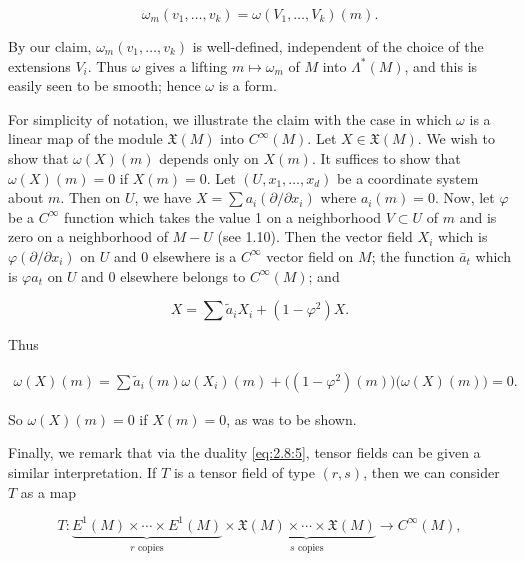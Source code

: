 \begin{equation}
\tag{4}\label{eq:2.18:4}
\omega_{m}(v_{1},\ldots,v_{k})=\omega(V_{1},\ldots,V_{k})(m).
\end{equation}

By our claim,  $ \omega_m(v_1, \ldots, v_k) $ is well-defined, independent of the choice of the extensions  $ V_i $. Thus  $ \omega $ gives a lifting  $ m \mapsto \omega_m $ of  $ M $ into  $ \Lambda^*(M) $, and this is easily seen to be smooth; hence  $ \omega $ is a form.

For simplicity of notation, we illustrate the claim with the case in which $\omega$ is a linear map of the module $\mathfrak{X}(M)$ into $C^\infty(M)$. Let $X\in\mathfrak{X}(M)$. We wish to show that $\omega(X)(m)$ depends only on $X(m)$. It suffices to show that $\omega(X)(m)=0$ if $X(m)=0$. Let $(U,x_1,\ldots,x_d)$ be a coordinate system about $m$. Then on $U$, we have $X=\sum a_i(\partial/\partial x_i)$ where $a_i(m)=0$. Now, let $\varphi$ be a $C^\infty$ function which takes the value 1 on a neighborhood $V\subset U$ of $m$ and is zero on a neighborhood of $M-U$ (see 1.10). Then the vector field $X_i$ which is $\varphi(\partial/\partial x_i)$ on $U$ and $0$ elsewhere is a $C^\infty$ vector field on $M$; the function $\bar{a}_t$ which is $\varphi a_t$ on $U$ and $0$ elsewhere belongs to $C^\infty(M)$; and

\begin{equation}
\tag{5}\label{eq:2.18:5}
X=\sum\tilde{a}_{i}X_{i}+(1-\varphi^{2})X.
\end{equation}

Thus

\begin{equation}
\tag{6}\label{eq:2.18:6}
\begin{array}{r}{\omega(X)(m)=\sum\tilde{a}_{i}(m)\omega(X_{i})(m)+\big((1-\varphi^{2})(m)\big)\big(\omega(X)(m)\big)=0.}\end{array}
\end{equation}

So  $ \omega(X)(m)=0 $ if  $ X(m)=0 $, as was to be shown.

Finally, we remark that via the duality \eqref{eq:2.8:5}, tensor fields can be given a similar interpretation. If $T$ is a tensor field of type $(r,s)$, then we can consider $T$ as a map

\begin{equation}
\tag{7}\label{eq:2.18:7}
T\colon\underbrace{E^{1}(M)\times\cdots\times E^{1}(M)}_{r\text{ copies}}\times\underbrace{\mathfrak{X}(M)\times\cdots\times\mathfrak{X}(M)}_{s\text{ copies}}\to C^{\infty}(M),
\end{equation}

